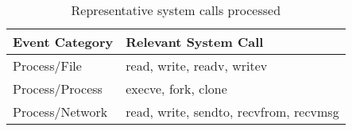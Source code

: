 \begin{table}[t]
\caption{Representative system calls processed}
\centering
\begin{adjustbox}{width=\linewidth}

\begin{tabular}{ll}
\hline
 \textbf{Event Category}&  \textbf{Relevant System Call}\\ \hline
Process/File & read, write, readv, writev  \\
Process/Process & execve, fork, clone  \\
Process/Network & read, write, sendto, recvfrom, recvmsg \\ \hline
\end{tabular}
\end{adjustbox}
\label{tab:events}
\end{table}
